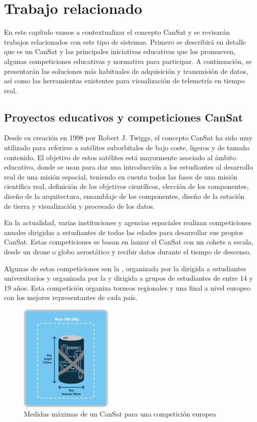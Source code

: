 \chapter{Trabajo relacionado}
\label{cap:trabajorRelacionado}
En este capítulo vamos a contextualizar el concepto CanSat y se revisarán trabajos relacionados con este tipo de sistemas.
Primero se describirá en detalle que es un CanSat y las principales iniciativas educativas que los promueven,
algunas competiciones educativas y normativa para participar.
A continuación, se presentarán las soluciones más habituales de adquisición y transmisión de datos, así como las herramientas existentes para visualización de telemetría en tiempo real.


\section{Proyectos educativos y competiciones CanSat}
Desde su creación en 1998 por Robert J. Twiggs, el concepto CanSat ha sido muy utilizado para referirse a satélites suborbitales de bajo coste,
ligeros y de tamaño contenido.
El objetivo de estos satélites está mayormente asociado al ámbito educativo, donde se usan para dar una introducción a los estudiantes al desarrollo real de una misión espacial,
teniendo en cuenta todas las fases de una misión científica real, definición de los objetivos científicos, elección de los componentes, diseño de la arquitectura, ensamblaje de los componentes,
diseño de la estación de tierra y visualización y procesado de los datos.

En la actualidad, varias instituciones y agencias espaciales realizan competiciones anuales dirigidas a estudiantes de todas las edades para desarrollar sus propios CanSat.
Estas competiciones se basan en lanzar el CanSat con un cohete a escala, desde un drone o globo aerostático y recibir datos durante el tiempo de descenso.

Algunas de estas competiciones son la \cite{cansatcompetition2025}, organizada por la \cite{american_astronautical_society2025} dirigida a estudiantes universitarios
y \cite{esa_cansat2025} organizada por la \cite{esa2025} y dirigida a grupos de estudiantes de entre 14 y 19 años.
Esta competición organiza torneos regionales y una final a nivel europeo con los mejores representantes de cada país.

\begin{figure}
    \centering
    \includegraphics[width=0.4\textwidth]{Imagenes/Bitmap/cansat_size}
    \caption{Medidas máximas de un CanSat para una competición europea}
    \label{fig:cansat_Size}
\end{figure}

